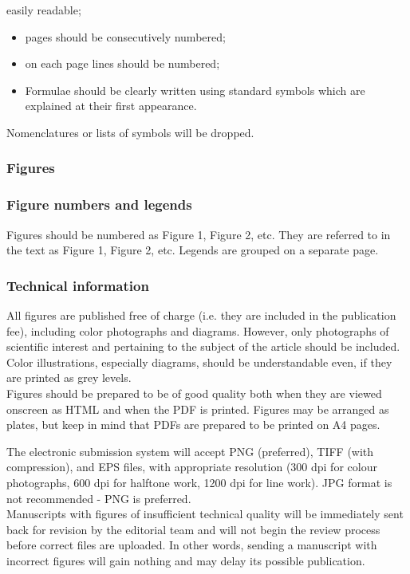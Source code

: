 easily readable; 
\begin{itemize}
\item pages should be consecutively numbered; 
\item on each page lines should be numbered; 
\item Formulae should be clearly written using standard symbols which are
explained at their first appearance. 
\end{itemize}
Nomenclatures or lists of symbols will be dropped.

\subsubsection{Figures}

\subsubsection*{Figure numbers and legends }

Figures should be numbered as Figure 1, Figure 2, etc. They are referred
to in the text as Figure 1, Figure 2, etc. Legends are grouped on
a separate page.

\subsubsection*{Technical information }

All figures are published free of charge (i.e. they are included in
the publication fee), including color photographs and diagrams. However,
only photographs of scientific interest and pertaining to the subject
of the article should be included. Color illustrations, especially
diagrams, should be understandable even, if they are printed as grey
levels.\\

Figures should be prepared to be of good quality both when they are
viewed onscreen as HTML and when the PDF is printed. Figures may be
arranged as \textquotedbl plates\textquotedbl , but keep in mind
that PDFs are prepared to be printed on A4 pages.

The electronic submission system will accept PNG (preferred), TIFF
(with compression), and EPS files, with appropriate resolution (300
dpi for colour photographs, 600 dpi for halftone work, 1200 dpi for
line work). JPG format is not recommended - PNG is preferred.\\

Manuscripts with figures of insufficient technical quality will be
immediately sent back for revision by the editorial team and will
not begin the review process before correct files are uploaded. In
other words, sending a manuscript with incorrect figures will gain
nothing and may delay its possible publication.

